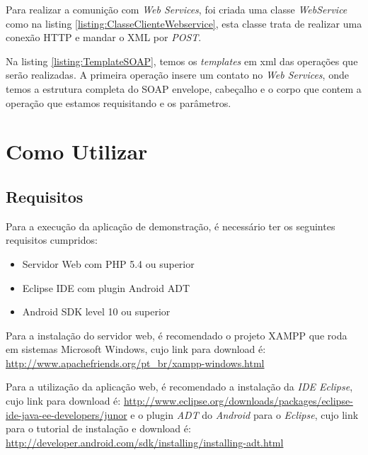 \documentclass{acm_proc_article-sp}
\begin{document}
	Para realizar a comunição com \emph{Web Services}, foi criada uma classe \emph{WebService} como na listing \ref{listing:ClasseClienteWebservice}, esta classe trata de realizar uma conexão HTTP e mandar o XML por \emph{POST}.
	
	
	
	Na listing \ref{listing:TemplateSOAP}, temos os \emph{templates} em xml das operações que serão realizadas. A primeira operação insere um contato no \emph{Web Services}, onde temos a estrutura completa do SOAP envelope, cabeçalho e o corpo que contem a operação que estamos requisitando e os parâmetros.
	
	
 
\section{Como Utilizar}

	\subsection{Requisitos}
	
	Para a execução da aplicação de demonstração, é necessário ter os seguintes requisitos cumpridos:
	
		\begin{itemize}
			\item Servidor Web com PHP 5.4 ou superior
			\item Eclipse IDE com plugin Android ADT
			\item Android SDK level 10 ou superior
		\end{itemize}
	
	Para a instalação do servidor web, é recomendado o projeto XAMPP que roda em sistemas Microsoft Windows, cujo link para download é: \url{ http://www.apachefriends.org/pt_br/xampp-windows.html}
	
	Para a utilização da aplicação web, é recomendado a instalação da \emph{IDE Eclipse}, cujo link para download é: \url{http://www.eclipse.org/downloads/packages/eclipse-ide-java-ee-developers/junor} e o plugin \emph{ADT} do \emph{Android} para o \emph{Eclipse}, cujo link para o tutorial de instalação e download é: \url{http://developer.android.com/sdk/installing/installing-adt.html}
		
\end{document}
